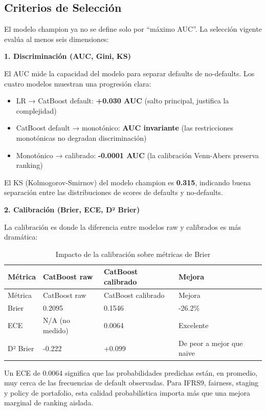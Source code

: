 \documentclass[
  spanish,
  11pt,
  letterpaper,
]{scrbook}
\providecommand{\tightlist}{%
  \setlength{\itemsep}{0pt}\setlength{\parskip}{0pt}}
\theoremstyle{plain}
\theoremstyle{remark}
\begin{document}
\subsection{Criterios de Selección}\label{criterios-de-selecciuxf3n}

El modelo champion ya no se define solo por ``máximo AUC''. La selección
vigente evalúa al menos seis dimensiones:

\textbf{1. Discriminación (AUC, Gini, KS)}

El AUC mide la capacidad del modelo para separar defaults de
no-defaults. Los cuatro modelos muestran una progresión clara:

\begin{itemize}
\tightlist
\item
  LR → CatBoost default: \textbf{+0.030 AUC} (salto principal, justifica
  la complejidad)
\item
  CatBoost default → monotónico: \textbf{AUC invariante} (las
  restricciones monotónicas no degradan discriminación)
\item
  Monotónico → calibrado: \textbf{-0.0001 AUC} (la calibración
  Venn-Abers preserva ranking)
\end{itemize}

El KS (Kolmogorov-Smirnov) del modelo champion es \textbf{0.315},
indicando buena separación entre las distribuciones de scores de
defaults y no-defaults.

\textbf{2. Calibración (Brier, ECE, D² Brier)}

La calibración es donde la diferencia entre modelos raw y calibrados es
más dramática:

\begin{longtable}[]{@{}llll@{}}
\caption{Impacto de la calibración sobre métricas de
Brier}\label{tbl-brier-calibration-impact}\tabularnewline
\toprule\noalign{}
Métrica & CatBoost raw & CatBoost calibrado & Mejora \\
\midrule\noalign{}
\endfirsthead
\toprule\noalign{}
Métrica & CatBoost raw & CatBoost calibrado & Mejora \\
\midrule\noalign{}
\endhead
\bottomrule\noalign{}
\endlastfoot
Brier & 0.2095 & 0.1546 & -26.2\% \\
ECE & N/A (no medido) & 0.0064 & Excelente \\
D² Brier & -0.222 & +0.099 & De peor a mejor que naive \\
\end{longtable}

Un ECE de 0.0064 significa que las probabilidades predichas están, en
promedio, muy cerca de las frecuencias de default observadas. Para
IFRS9, fairness, staging y policy de portafolio, esta calidad
probabilística importa más que una mejora marginal de ranking aislada.
\end{document}
